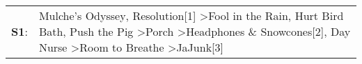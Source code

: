 \begin{supertabular}{p{0.03\textwidth}p{0.92\textwidth}}
 \textbf{S1}:  &  Mulche's Odyssey\textsuperscript{}, \enspace Resolution[1]\textsuperscript{} \textgreater \enspace Fool in the Rain\textsuperscript{}, \enspace Hurt Bird Bath\textsuperscript{}, \enspace Push the Pig\textsuperscript{} \textgreater \enspace Porch\textsuperscript{} \textgreater \enspace Headphones \& Snowcones[2]\textsuperscript{}, \enspace Day Nurse\textsuperscript{} \textgreater \enspace Room to Breathe\textsuperscript{} \textgreater \enspace JaJunk[3]\textsuperscript{}  \enspace  \\
\end{supertabular}
